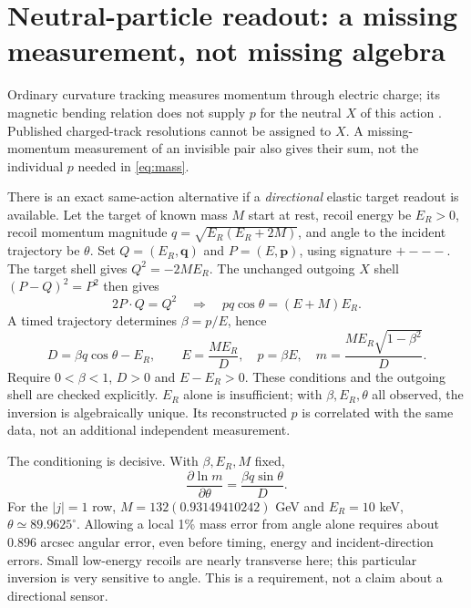 \documentclass[11pt,a4paper]{article}
\begin{document}
\newpage
\section{Neutral-particle readout: a missing measurement, not missing algebra}
Ordinary curvature tracking measures momentum through electric charge;
its magnetic bending relation does not supply $p$ for the neutral $X$
of this action \cite{pdgdet}. Published charged-track resolutions cannot
be assigned to $X$. A missing-momentum measurement of an invisible pair
also gives their sum, not the individual $p$ needed in \eqref{eq:mass}.

There is an exact same-action alternative if a \emph{directional}
elastic target readout is available. Let the target of known mass $M$
start at rest, recoil energy be $E_R>0$, recoil momentum magnitude
$q=\sqrt{E_R(E_R+2M)}$, and angle to the incident trajectory be $\theta$.
Set $Q=(E_R,\mathbf q)$ and $P=(E,\mathbf p)$, using signature $+---$.
The target shell gives $Q^2=-2ME_R$. The unchanged outgoing $X$ shell
$(P-Q)^2=P^2$ then gives
\begin{equation}
 2P\cdot Q=Q^2
 \quad\Longrightarrow\quad p q\cos\theta=(E+M)E_R .
\end{equation}
A timed trajectory determines $\beta=p/E$, hence
\begin{equation}\label{eq:direction}
 D=\beta q\cos\theta-E_R,\qquad
 \boxed{E=\frac{ME_R}{D},\quad p=\beta E,\quad
 m=\frac{ME_R\sqrt{1-\beta^2}}{D}.}
\end{equation}
Require $0<\beta<1$, $D>0$ and $E-E_R>0$. These conditions and the
outgoing shell are checked explicitly. $E_R$ alone is insufficient;
with $\beta,E_R,\theta$ all observed, the inversion is algebraically
unique. Its reconstructed $p$ is correlated with the same data, not
an additional independent measurement.

The conditioning is decisive. With $\beta,E_R,M$ fixed,
\begin{equation}
 \frac{\partial\ln m}{\partial\theta}
       =\frac{\beta q\sin\theta}{D}.
\end{equation}
For the $|j|=1$ row, $M=132(0.93149410242)$ GeV and $E_R=10$ keV,
$\theta\simeq89.9625^\circ$. Allowing a local 1\% mass error from angle
alone requires about $0.896$ arcsec angular error, even before timing,
energy and incident-direction errors. Small low-energy recoils are
nearly transverse here; this particular inversion is very sensitive
to angle. This is a requirement, not a claim about a directional sensor.
\end{document}
